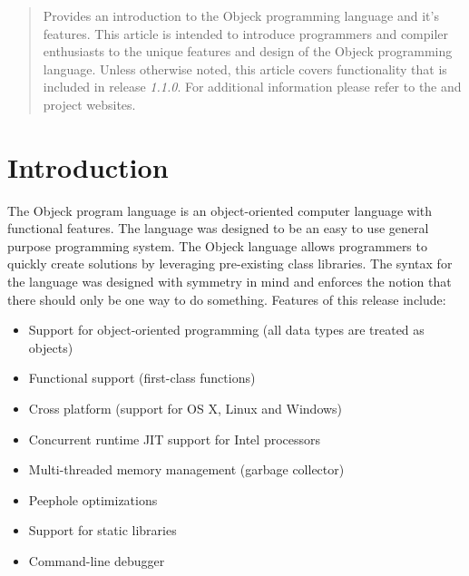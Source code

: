 \documentclass[12pt]{article}
\begin{document}
\maketitle
\thispagestyle{empty}

\vspace{\baselineskip}

\begin{abstract}
Provides an introduction to the Objeck programming language and it's features.  This article is intended to introduce programmers and compiler enthusiasts to the unique features and design of the Objeck programming language.   Unless otherwise noted, this article covers functionality that is included in release \textit{1.1.0}.  For additional information please refer to the  and  project websites.
\end{abstract}

\newpage
\tableofcontents
\newpage

\label{Introduction}
\section{Introduction}
The Objeck program language is an object-oriented computer language with functional features.  The language was designed to be an easy to use general purpose programming system.  The Objeck language allows programmers to quickly create solutions by leveraging pre-existing class libraries.  The syntax for the language was designed with symmetry in mind and enforces the notion that there should only be one way to do something. Features of this release include:
\begin{itemize}
	\item Support for object-oriented programming (all data types are treated as objects)
	\item Functional support (first-class functions) 
	\item Cross platform (support for OS X, Linux and Windows)
	\item Concurrent runtime JIT support for Intel processors
	\item Multi-threaded memory management (garbage collector)
	\item Peephole optimizations
	\item Support for static libraries
	\item Command-line debugger
\end{itemize}
\end{document}
